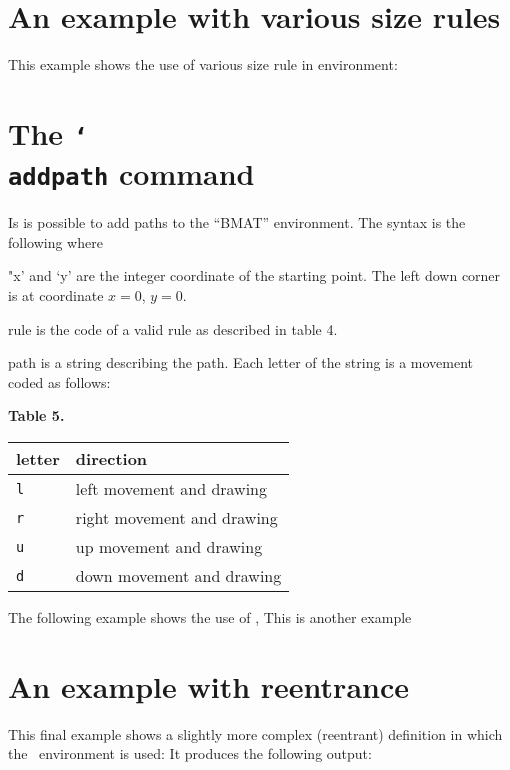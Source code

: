 \documentclass[twoside,a4paper]{article}
\begin{document}
\latex{\clearpage}
\section{An example with various size rules}
This example shows the use of various size rule in  
environment:
%
%


\section{The \texttt{\char`\\addpath} command}
Is is possible to add paths to the ``BMAT'' environment. The syntax 
is the following
%
%
where
\begin{desc}
  \item["x' and `y']
  are the integer coordinate of the starting point.  The left down
  corner is at coordinate $x=0$, $y=0$.
  \item[rule]
  is the code of a valid rule as described in table 4.
  \item[path]
  is a string describing the path.  Each letter of the string is a
  movement coded as follows:
  \begin{center}
    \par
    \textbf{Table 5.} \\[1em]
    \begin{tabular}{|l|l|}
      \hline
      letter & direction \\
      \hline
      \verb|l| & left movement and drawing \\
      \verb|r| & right movement and drawing \\
      \verb|u| & up movement and drawing \\
      \verb|d| & down movement and drawing \\
      \hline
    \end{tabular}
    \par
  \end{center}
\end{desc}
%
The following example shows the use of ,
%
%
This is another example
%
%


\section{An example with reentrance}
This final example shows a slightly more complex (reentrant)
definition in which the ~environment is used:
%
%
It produces the following output:
%
%
\end{document}
